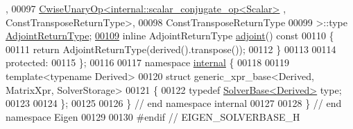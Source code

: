 \begin{DoxyCode}
      ,
00097                         \hyperlink{group___core___module_class_eigen_1_1_cwise_unary_op}{CwiseUnaryOp<internal::scalar\_conjugate\_op<Scalar>}
      , ConstTransposeReturnType>,
00098                         ConstTransposeReturnType
00099                      >::type \hyperlink{class_eigen_1_1internal_1_1_tensor_lazy_evaluator_writable}{AdjointReturnType};
\hyperlink{class_eigen_1_1_solver_base_a05a3686a89888681c8e0c2bcab6d1ce5}{00109}     \textcolor{keyword}{inline} AdjointReturnType \hyperlink{class_eigen_1_1_solver_base_a05a3686a89888681c8e0c2bcab6d1ce5}{adjoint}()\textcolor{keyword}{ const}
00110 \textcolor{keyword}{    }\{
00111       \textcolor{keywordflow}{return} AdjointReturnType(derived().transpose());
00112     \}
00113 
00114   \textcolor{keyword}{protected}:
00115 \};
00116 
00117 \textcolor{keyword}{namespace }\hyperlink{namespaceinternal}{internal} \{
00118 
00119 \textcolor{keyword}{template}<\textcolor{keyword}{typename} Derived>
00120 \textcolor{keyword}{struct }generic\_xpr\_base<Derived, MatrixXpr, SolverStorage>
00121 \{
00122   \textcolor{keyword}{typedef} \hyperlink{class_eigen_1_1_solver_base}{SolverBase<Derived>} type;
00123 
00124 \};
00125 
00126 \} \textcolor{comment}{// end namespace internal}
00127 
00128 \} \textcolor{comment}{// end namespace Eigen}
00129 
00130 \textcolor{preprocessor}{#endif // EIGEN\_SOLVERBASE\_H}
\end{DoxyCode}
